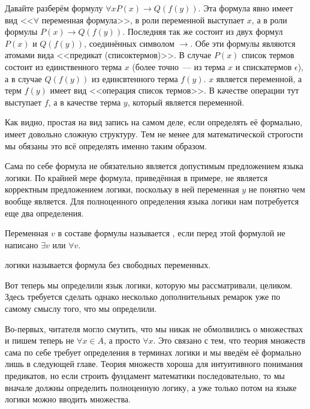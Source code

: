 \begin{example}
Давайте разберём формулу $\forall x P(x) \to Q(f(y))$. Эта формула явно имеет вид <<$\forall$ переменная формула>>, в роли переменной выступает $x$, а в роли формулы $P(x) \to Q(f(y))$. Последняя так же состоит из двух формул $P(x)$ и $Q(f(y))$, соединённых символом $\to$. Обе эти формулы являются атомами вида <<предикат (списоктермов)>>. В случае $P(x)$ список термов состоит из единственного терма $x$ (более точно~--- из терма $x$ и спискатермов $\epsilon$), а в случае $Q(f(y))$ из единсвтенного терма $f(y)$. $x$ является переменной, а терм $f(y)$ имеет вид <<операция список термов>>. В качестве операции тут выступает $f$, а в качестве терма $y$, который является переменной.
\end{example}

Как видно, простая на вид запись на самом деле, если определять её формально, имеет довольно сложную структуру. Тем не менее для математической строгости мы обязаны это всё определять именно таким образом.

Сама по себе формула не обязательно является допустимым предложением языка логики. По крайней мере формула, приведённая в примере, не является корректным предложением логики, поскольку в ней переменная $y$ не понятно чем вообще является. Для полноценного определения языка логики нам потребуется еще два определения.

\begin{definition}
Переменная $v$ в составе формулы называется , если перед этой формулой не написано $\exists v$ или $\forall v$.
\end{definition}

\begin{definition}
 логики называется формула без свободных переменных.
\end{definition}

Вот теперь мы определили язык логики, которую мы рассматривали, целиком. Здесь требуется сделать однако несколько дополнительных ремарок уже по самому смыслу того, что мы определили.

Во-первых, читателя могло смутить, что мы никак не обмолвились о множествах и пишем теперь не $\forall x\in A$, а просто $\forall x$. Это связано с тем, что теория множеств сама по себе требует определения в терминах логики и мы введём её формально лишь в следующей главе. Теория множеств хороша для интуитивного понимания предикатов, но если строить фундамент математики последовательно, то мы вначале должны определить полноценную логику, а уже только потом на языке логики можно вводить множества.


